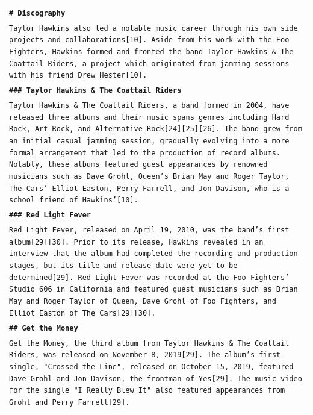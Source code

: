 \documentclass[11pt]{article}
\begin{document}
\begin{longtable}{p{\textwidth}}
\vspace{1pt}
\texttt{\small{\textbf{\# Discography}}} \\
\texttt{\small{Taylor Hawkins also led a notable music career through his own side projects and collaborations[10]. Aside from his work with the Foo Fighters, Hawkins formed and fronted the band Taylor Hawkins \& The Coattail Riders, a project which originated from jamming sessions with his friend Drew Hester[10].}} \\
\vspace{1pt}
\texttt{\small{\textbf{\#\#\# Taylor Hawkins \& The Coattail Riders}}} \\
\texttt{\small{Taylor Hawkins \& The Coattail Riders, a band formed in 2004, have released three albums and their music spans genres including Hard Rock, Art Rock, and Alternative Rock[24][25][26]. The band grew from an initial casual jamming session, gradually evolving into a more formal arrangement that led to the production of record albums. Notably, these albums featured guest appearances by renowned musicians such as Dave Grohl, Queen's Brian May and Roger Taylor, The Cars' Elliot Easton, Perry Farrell, and Jon Davison, who is a school friend of Hawkins'[10].}} \\
\vspace{1pt}
\texttt{\small{\textbf{\#\#\# Red Light Fever}}} \\
\texttt{\small{Red Light Fever, released on April 19, 2010, was the band's first album[29][30]. Prior to its release, Hawkins revealed in an interview that the album had completed the recording and production stages, but its title and release date were yet to be determined[29]. Red Light Fever was recorded at the Foo Fighters' Studio 606 in California and featured guest musicians such as Brian May and Roger Taylor of Queen, Dave Grohl of Foo Fighters, and Elliot Easton of The Cars[29][30].}} \\
\vspace{1pt}
\texttt{\small{\textbf{\#\# Get the Money}}} \\
\texttt{\small{Get the Money, the third album from Taylor Hawkins \& The Coattail Riders, was released on November 8, 2019[29]. The album's first single, "Crossed the Line", released on October 15, 2019, featured Dave Grohl and Jon Davison, the frontman of Yes[29]. The music video for the single "I Really Blew It" also featured appearances from Grohl and Perry Farrell[29].}} \\


\end{longtable}
\end{document}
